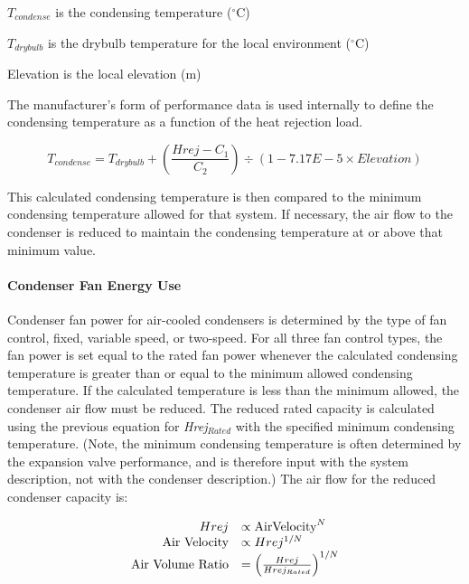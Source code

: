 \(T_{condense}\) is the condensing temperature (\(^{\circ}\)C)

\(T_{drybulb}\) is the drybulb temperature for the local environment (\(^{\circ}\)C)

Elevation is the local elevation (m)

The manufacturer's form of performance data is used internally to define the condensing temperature as a function of the heat rejection load.

\begin{equation}
{T_{condense}} = {T_{drybulb}} + \left( {\frac{{Hrej - {C_1}}}{{{C_2}}}} \right) \div (1 - 7.17E - 5 \times Elevation)
\end{equation}

This calculated condensing temperature is then compared to the minimum condensing temperature allowed for that system. If necessary, the air flow to the condenser is reduced to maintain the condensing temperature at or above that minimum value.

\paragraph{Condenser Fan Energy Use}\label{condenser-fan-energy-use-1}

Condenser fan power for air-cooled condensers is determined by the type of fan control, fixed, variable speed, or two-speed. For all three fan control types, the fan power is set equal to the rated fan power whenever the calculated condensing temperature is greater than or equal to the minimum allowed condensing temperature. If the calculated temperature is less than the minimum allowed, the condenser air flow must be reduced. The reduced rated capacity is calculated using the previous equation for \emph{Hrej\(_{Rated}\)} with the specified minimum condensing temperature. (Note, the minimum condensing temperature is often determined by the expansion valve performance, and is therefore input with the system description, not with the condenser description.) The air flow for the reduced condenser capacity is:

\begin{equation}
  \begin{array}{rl}
    Hrej &\propto \text{AirVelocity}^N \\
    \text{Air Velocity} &\propto Hrej^{1/N} \\
    \text{Air Volume Ratio} &= \left(\frac{Hrej}{Hrej_{Rated}}\right)^{1/N}
  \end{array}
\end{equation}

